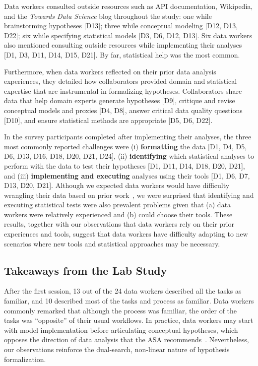 Data workers consulted outside resources such as API documentation, Wikipedia, and
the \textit{Towards Data Science} blog throughout the study: one while
brainstorming hypotheses [D13]; three while conceptual modeling [D12, D13, D22];
six while specifying statistical models [D3, D6, D12, D13]. Six data workers
also mentioned consulting outside resources while implementing their analyses
[D1, D3, D11, D14, D15, D21]. By far, statistical help was the most common. 

Furthermore, when data workers reflected on their prior data analysis experiences,
they detailed how collaborators provided domain and statistical expertise that
are instrumental in formalizing hypotheses. Collaborators share data that help
domain experts generate hypotheses [D9], critique and revise conceptual models
and proxies [D4, D8], answer critical data quality questions [D10],
and ensure statistical methods are appropriate [D5, D6, D22].

In the survey participants completed after implementing their analyses, the three most
commonly reported challenges were (i) \textbf{formatting} the data [D1, D4,
D5, D6, D13, D16, D18, D20, D21, D24], (ii) \textbf{identifying} which
statistical analyses to perform with the data to test their hypotheses [D1,
D11, D14, D18, D20, D21], and (iii) \textbf{implementing and executing} analyses
using their tools [D1, D6, D7, D13, D20, D21]. Although we expected data workers
would have difficulty wrangling their data based on prior
work~\cite{kandel2012enterprise}, we were surprised that identifying and
executing statistical tests were also prevalent problems given that (a) data workers
were relatively experienced and (b) could choose their tools. These results, together with 
our observations that data workers rely on their prior experiences and tools, suggest
that data workers have difficulty adapting to new scenarios where new tools and
statistical approaches may be necessary. 

\subsection{Takeaways from the Lab Study}
After the first session, 13 out of the 24 data workers described all the tasks as
familiar, and 10 described most of the tasks and process as familiar. Data workers
commonly remarked that although the process was familiar, the order of the tasks
was ``opposite'' of their usual workflows. In practice, data workers may start with
model implementation before articulating conceptual hypotheses, which opposes
the direction of data analysis that the ASA
recommends~\cite{carver2016guidelines}. Nevertheless, our observations reinforce
the dual-search, non-linear nature of hypothesis formalization.

